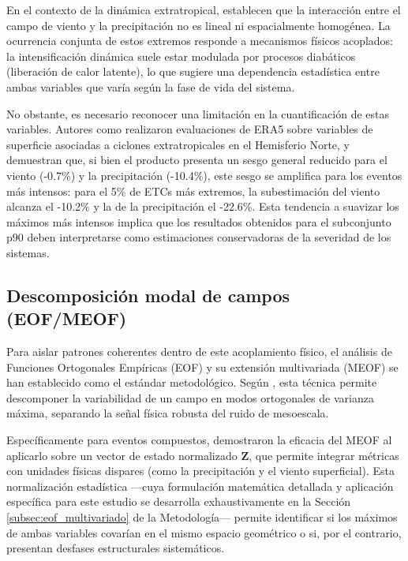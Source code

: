 En el contexto de la dinámica extratropical, \citet{chen2025characteristics} establecen que la interacción entre el campo de viento y la precipitación no es lineal ni espacialmente homogénea. 
La ocurrencia conjunta de estos extremos responde a mecanismos físicos acoplados: la intensificación dinámica suele estar modulada por procesos diabáticos (liberación de calor latente), lo que sugiere una dependencia estadística entre ambas variables que varía según la fase de vida del sistema. 

No obstante, es necesario reconocer una limitación en la cuantificación de estas variables. 
Autores como \citet{chen2024evaluation} realizaron evaluaciones de ERA5 sobre variables de superficie asociadas a ciclones extratropicales en el Hemisferio Norte, y demuestran que, si bien el producto presenta un sesgo general reducido para el viento (-0.7\%) y la precipitación (-10.4\%), este sesgo se amplifica para los eventos más intensos: para el 5\% de ETCs más extremos, la subestimación del viento alcanza el -10.2\% y la de la precipitación el -22.6\%. 
Esta tendencia a suavizar los máximos más intensos implica que los resultados obtenidos para el subconjunto p90 deben interpretarse como estimaciones conservadoras de la severidad de los sistemas.

\subsection{Descomposición modal de campos (EOF/MEOF)}\label{subsec:tb_math_meof}

Para aislar patrones coherentes dentro de este acoplamiento físico, el análisis de Funciones Ortogonales Empíricas (EOF) y su extensión multivariada (MEOF) se han establecido como el estándar metodológico. Según \citet{hannachi2007empirical}, esta técnica permite descomponer la variabilidad de un campo en modos ortogonales de varianza máxima, separando la señal física robusta del ruido de mesoescala. 

Específicamente para eventos compuestos, \citet{liang2018multivariate} demostraron la eficacia del MEOF al aplicarlo sobre un vector de estado normalizado $\mathbf{Z}$, que permite integrar métricas con unidades físicas dispares (como la precipitación y el viento superficial). Esta normalización estadística —cuya formulación matemática detallada y aplicación específica para este estudio se desarrolla exhaustivamente en la Sección \ref{subsec:eof_multivariado} de la Metodología— permite identificar si los máximos de ambas variables covarían en el mismo espacio geométrico o si, por el contrario, presentan desfases estructurales sistemáticos.

